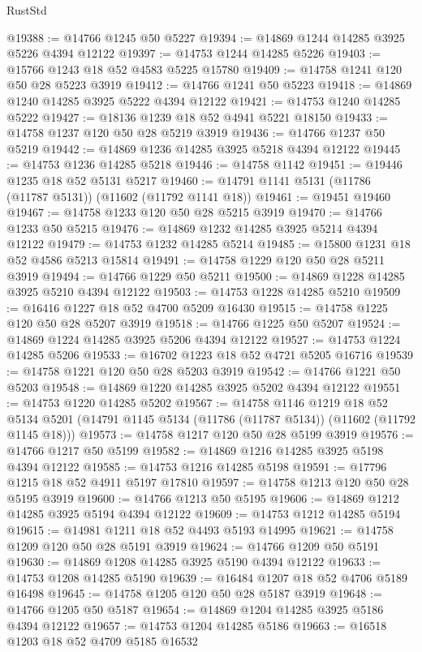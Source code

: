 \begin{lexlean}{RustStd}
\begin{coremodule}
@19388 := @14766 @1245 @50 @5227
@19394 := @14869 @1244 @14285 @3925 @5226 @4394 @12122
@19397 := @14753 @1244 @14285 @5226
@19403 := @15766 @1243 @18 @52 @4583 @5225 @15780
@19409 := @14758 @1241 @120 @50 @28 @5223 @3919
@19412 := @14766 @1241 @50 @5223
@19418 := @14869 @1240 @14285 @3925 @5222 @4394 @12122
@19421 := @14753 @1240 @14285 @5222
@19427 := @18136 @1239 @18 @52 @4941 @5221 @18150
@19433 := @14758 @1237 @120 @50 @28 @5219 @3919
@19436 := @14766 @1237 @50 @5219
@19442 := @14869 @1236 @14285 @3925 @5218 @4394 @12122
@19445 := @14753 @1236 @14285 @5218
@19446 := @14758 @1142
@19451 := @19446 @1235 @18 @52 @5131 @5217
@19460 := @14791 @1141 @5131 (@11786 (@11787 @5131)) (@11602 (@11792 @1141 @18))
@19461 := @19451 @19460
@19467 := @14758 @1233 @120 @50 @28 @5215 @3919
@19470 := @14766 @1233 @50 @5215
@19476 := @14869 @1232 @14285 @3925 @5214 @4394 @12122
@19479 := @14753 @1232 @14285 @5214
@19485 := @15800 @1231 @18 @52 @4586 @5213 @15814
@19491 := @14758 @1229 @120 @50 @28 @5211 @3919
@19494 := @14766 @1229 @50 @5211
@19500 := @14869 @1228 @14285 @3925 @5210 @4394 @12122
@19503 := @14753 @1228 @14285 @5210
@19509 := @16416 @1227 @18 @52 @4700 @5209 @16430
@19515 := @14758 @1225 @120 @50 @28 @5207 @3919
@19518 := @14766 @1225 @50 @5207
@19524 := @14869 @1224 @14285 @3925 @5206 @4394 @12122
@19527 := @14753 @1224 @14285 @5206
@19533 := @16702 @1223 @18 @52 @4721 @5205 @16716
@19539 := @14758 @1221 @120 @50 @28 @5203 @3919
@19542 := @14766 @1221 @50 @5203
@19548 := @14869 @1220 @14285 @3925 @5202 @4394 @12122
@19551 := @14753 @1220 @14285 @5202
@19567 := @14758
    @1146
    @1219
    @18
    @52
    @5134
    @5201
    (@14791 @1145 @5134 (@11786 (@11787 @5134)) (@11602 (@11792 @1145 @18)))
@19573 := @14758 @1217 @120 @50 @28 @5199 @3919
@19576 := @14766 @1217 @50 @5199
@19582 := @14869 @1216 @14285 @3925 @5198 @4394 @12122
@19585 := @14753 @1216 @14285 @5198
@19591 := @17796 @1215 @18 @52 @4911 @5197 @17810
@19597 := @14758 @1213 @120 @50 @28 @5195 @3919
@19600 := @14766 @1213 @50 @5195
@19606 := @14869 @1212 @14285 @3925 @5194 @4394 @12122
@19609 := @14753 @1212 @14285 @5194
@19615 := @14981 @1211 @18 @52 @4493 @5193 @14995
@19621 := @14758 @1209 @120 @50 @28 @5191 @3919
@19624 := @14766 @1209 @50 @5191
@19630 := @14869 @1208 @14285 @3925 @5190 @4394 @12122
@19633 := @14753 @1208 @14285 @5190
@19639 := @16484 @1207 @18 @52 @4706 @5189 @16498
@19645 := @14758 @1205 @120 @50 @28 @5187 @3919
@19648 := @14766 @1205 @50 @5187
@19654 := @14869 @1204 @14285 @3925 @5186 @4394 @12122
@19657 := @14753 @1204 @14285 @5186
@19663 := @16518 @1203 @18 @52 @4709 @5185 @16532

\end{coremodule}
\end{lexlean}
